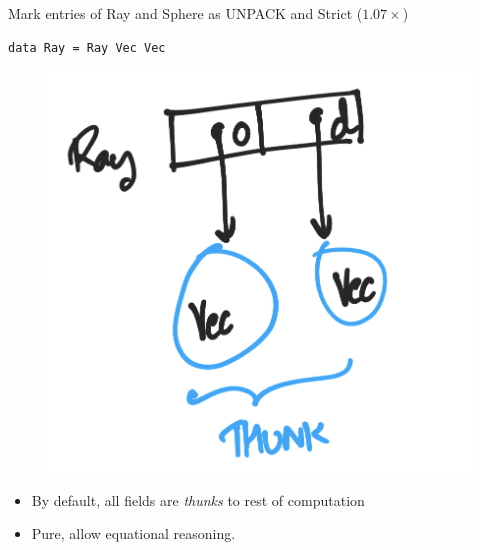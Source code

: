 \documentclass[8pt]{beamer}
\begin{document}
\begin{frame}[fragile]{Mark entries of Ray and Sphere as UNPACK and Strict ($1.07\times$)}
\begin{verbatim}
data Ray = Ray Vec Vec 
\end{verbatim}

\begin{figure}
\includegraphics[height=0.4\textheight]{./ray-thunk.png}
\end{figure}

\begin{itemize}
\item By default, all fields are \emph{thunks} to rest of computation
\item Pure, allow equational reasoning.
\end{itemize}
\end{frame}
\end{document}

